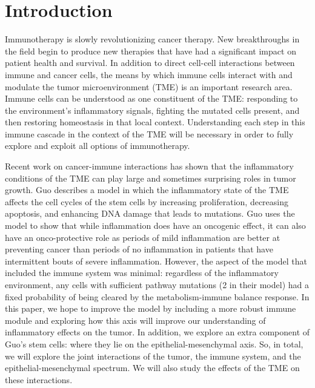 \documentclass[11pt, a4paper, preprint]{article}
\begin{document}
\section{Introduction}
Immunotherapy is slowly revolutionizing cancer therapy. New breakthroughs in the field begin to produce new therapies that have had a significant impact on patient health and survival\cite{pardoll2012blockade}\cite{restifo2012adoptive}.
In addition to direct cell-cell interactions between immune and cancer cells, the means by which immune cells interact with and modulate the tumor microenvironment (TME) is an important research area. Immune cells can be understood as one constituent of the TME: responding to the environment's inflammatory signals, fighting the mutated cells present, and then restoring homeostasis in that local context\cite{de2006paradoxical}.
Understanding each step in this immune cascade in the context of the TME will be necessary in order to fully explore and exploit all options of immunotherapy.

Recent work on cancer-immune interactions has shown that the inflammatory conditions of the TME can play large and sometimes surprising roles in tumor growth.
Guo describes a model in which the inflammatory state of the TME affects the cell cycles of the stem cells by increasing proliferation, decreasing apoptosis, and enhancing DNA damage that leads to mutations\cite{guo2017multiscale}.
Guo uses the model to show that while inflammation does have an oncogenic effect, it can also have an onco-protective role as periods of mild inflammation are better at preventing cancer than periods of no inflammation in patients that have intermittent bouts of severe inflammation.
However, the aspect of the model that included the immune system was minimal: regardless of the inflammatory environment, any cells with sufficient pathway mutations (2 in their model) had a fixed probability of being cleared by the metabolism-immune balance response. 
In this paper, we hope to improve the model by including a more robust immune module and exploring how this axis will improve our understanding of inflammatory effects on the tumor.
In addition, we explore an extra component of Guo's stem cells: where they lie on the epithelial-mesenchymal axis.
So, in total, we will explore the joint interactions of the tumor, the immune system, and the epithelial-mesenchymal spectrum.
We will also study the effects of the TME on these interactions.
\end{document}
